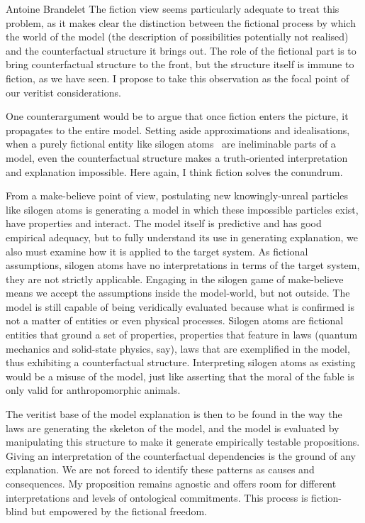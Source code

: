 \begin{artengenv}{Antoine Brandelet}
The fiction view seems particularly adequate to treat this problem, as it makes clear the distinction between the fictional process by which the world of the model (the description of possibilities potentially not realised) and the counterfactual structure it brings out. The role of the fictional part is to bring counterfactual structure to the front, but the structure itself is immune to fiction, as we have seen. I propose to take this observation as the focal point of our veritist considerations.

One counterargument would be to argue that once fiction enters the picture, it propagates to the entire model. Setting aside approximations and idealisations, when a purely fictional entity like silogen atoms~\parencite{Winsberg2006} are ineliminable parts of a model, even the counterfactual structure makes a truth-oriented interpretation and explanation impossible. Here again, I think fiction solves the conundrum.

From a make-believe point of view, postulating new knowingly-unreal particles like silogen atoms is generating a model in which these impossible particles exist, have properties and interact. The model itself is predictive and has good empirical adequacy, but to fully understand its use in generating explanation, we also must examine how it is applied to the target system. As fictional assumptions, silogen atoms have no interpretations in terms of the target system, they are not strictly applicable. Engaging in the silogen game of make-believe means we accept the assumptions inside the model-world, but not outside. The model is still capable of being veridically evaluated because what is confirmed is not a matter of entities or even physical processes. Silogen atoms are fictional entities that ground a set of properties, properties that feature in laws (quantum mechanics and solid-state physics, say), laws that are exemplified in the model, thus exhibiting a counterfactual structure. Interpreting silogen atoms as existing would be a misuse of the model, just like asserting that the moral of the fable is only valid for anthropomorphic animals.

The veritist base of the model explanation is then to be found in the way the laws are generating the skeleton of the model, and the model is evaluated by manipulating this structure to make it generate empirically testable propositions. Giving an interpretation of the counterfactual dependencies is the ground of any explanation. We are not forced to identify these patterns as causes and consequences. My proposition remains agnostic and offers room for different interpretations and levels of ontological commitments. This process is fiction-blind but empowered by the fictional freedom.



\end{artengenv}
